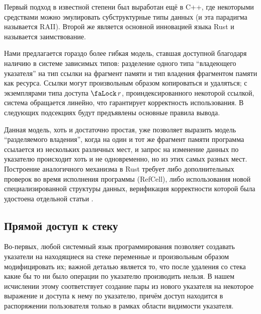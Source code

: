 \documentclass[12pt]{article}
\DeclareMathOperator{\access}{\text{\faLock}}
\DeclareMathOperator{\inn}{in}
\DeclareMathOperator{\lett}{let}
\DeclareMathOperator{\type}{type}
\newcommand{\letin}[3]{\lett\,#1=#2\,\inn\,#3}
\begin{document}
Первый подход в известной степени был выработан ещё в C++, где некоторыми
средствами можно эмулировать субструктурные типы данных (и эта парадигма
называется RAII). Второй же является основной инновацией языка Rust и называется
заимствование.

Нами предлагается гораздо более гибкая модель, ставшая доступной благодаря
наличию в системе зависимых типов: разделение одного типа ``владеющего
указателя'' на тип ссылки на фрагмент памяти и тип владения фрагментом памяти
как ресурса. Ссылки могут произвольным образом копироваться и удаляться; с
экземплярами типа доступа $\access r$, проиндексированного некоторой ссылкой,
система обращается линейно, что гарантирует корректность использования. В
следующих подсекциях будут предъявлены основные правила вывода.

Данная модель, хоть и достаточно простая, уже позволяет выразить модель
``разделяемого владения'', когда на один и тот же фрагмент памяти программа
ссылается из нескольких различных мест, и запрос на изменение данных по
указателю происходит хоть и не одновременно, но из этих самых разных мест.
Построение аналогичного механизма в Rust требует либо дополнительных проверок во
время исполнения программы (RefCell), либо использования новой
специализированной структуры данных, верификация корректности которой была
удостоена отдельной статьи \cite{ghostcell}.

\subsection{Прямой доступ к стеку}

Во-первых, любой системный язык программирования позволяет создавать указатели
на находящиеся на стеке переменные и произвольным образом модифицировать их;
важной деталью является то, что после удаления со стека какие бы то ни было
операции по указателю производить нельзя. В нашем исчислении этому соответствует
создание пары из нового указателя на некоторое выражение и доступа к нему по
указателю, причём доступ находится в распоряжении пользователя только в рамках
области видимости указателя.
\end{document}
